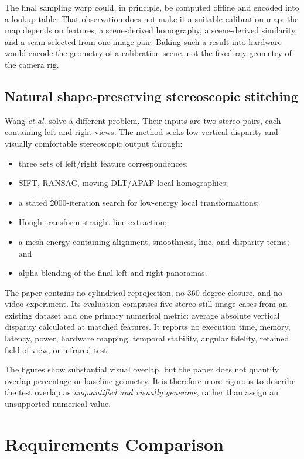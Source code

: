 \documentclass[10pt]{article}
\begin{document}
The final sampling warp could, in principle, be computed offline and encoded into a lookup table. That observation does not make it a suitable calibration map: the map depends on features, a scene-derived homography, a scene-derived similarity, and a seam selected from one image pair. Baking such a result into hardware would encode the geometry of a calibration scene, not the fixed ray geometry of the camera rig.

\subsection{Natural shape-preserving stereoscopic stitching}

Wang \emph{et al.} \cite{wang2018} solve a different problem. Their inputs are two stereo pairs, each containing left and right views. The method seeks low vertical disparity and visually comfortable stereoscopic output through:

\begin{itemize}
  \item three sets of left/right feature correspondences;
  \item SIFT, RANSAC, moving-DLT/APAP local homographies;
  \item a stated 2000-iteration search for low-energy local transformations;
  \item Hough-transform straight-line extraction;
  \item a mesh energy containing alignment, smoothness, line, and disparity terms; and
  \item alpha blending of the final left and right panoramas.
\end{itemize}

The paper contains no cylindrical reprojection, no 360-degree closure, and no video experiment. Its evaluation comprises five stereo still-image cases from an existing dataset and one primary numerical metric: average absolute vertical disparity calculated at matched features. It reports no execution time, memory, latency, power, hardware mapping, temporal stability, angular fidelity, retained field of view, or infrared test.

The figures show substantial visual overlap, but the paper does not quantify overlap percentage or baseline geometry. It is therefore more rigorous to describe the test overlap as \emph{unquantified and visually generous}, rather than assign an unsupported numerical value.

\section{Requirements Comparison}
\end{document}
